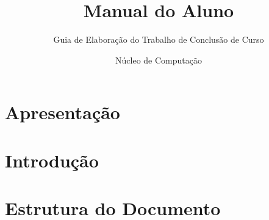 \documentclass[a4paper,12pt]{scrartcl}
\begin{document}
\title{Manual do Aluno}
\subtitle{Guia de Elaboração do Trabalho de Conclusão de Curso}
\author{Núcleo de Computação\\ }


\maketitle

\section*{Apresentação}


\section{Introdução}

\section{Estrutura do Documento}







\end{document}
